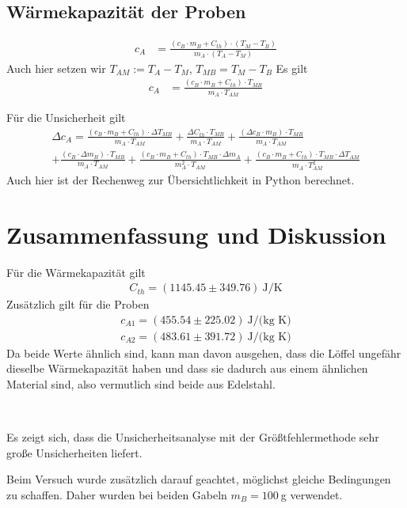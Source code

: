 \documentclass{article}
\begin{document}
\subsection{Wärmekapazität der Proben}

\begin{align}
c_A &=  \frac{(c_B\cdot m_B  + C_{th}) \cdot (T_M - T_B)}{m_A \cdot (T_A - T_M)}
\end{align}
Auch hier setzen wir $T_{AM} := T_A - T_M$, $T_{MB} = T_M-T_B$ 
Es gilt
\begin{align}
c_A &=  \frac{(c_B\cdot m_B  + C_{th}) \cdot T_{MB}}{m_A \cdot T_{AM}}
\end{align}

Für die Unsicherheit gilt
\begin{align*}
\Delta c_A =
\frac{(c_B\cdot m_B  + C_{th}) \cdot \Delta T_{MB}}{m_A \cdot T_{AM}} +
\frac{\Delta C_{th} \cdot T_{MB}}{m_A \cdot T_{AM}} +
\frac{(\Delta c_B\cdot m_B  ) \cdot T_{MB}}{m_A \cdot T_{AM}} \\
+\frac{(c_B\cdot \Delta m_B ) \cdot T_{MB}}{m_A \cdot T_{AM}}
+\frac{(c_B\cdot m_B  + C_{th}) \cdot T_{MB}\cdot \Delta m_A}{m_A^2 \cdot T_{AM}}
+\frac{(c_B\cdot m_B  + C_{th}) \cdot T_{MB}\cdot \Delta T_{AM}}{m_A \cdot T_{AM}^2}
\end{align*}
Auch hier ist der Rechenweg zur Übersichtlichkeit in Python berechnet.

\newpage
\section{Zusammenfassung und Diskussion}

Für die Wärmekapazität gilt
\begin{align}
C_{th} = (1145.45 \pm 349.76)~\text{J}/\text{K}
\end{align}
Zusätzlich gilt für die Proben
\begin{align}
c_{A1} = (455.54 \pm 225.02)~\text{J/(kg K)} \\
c_{A2} = (483.61 \pm 391.72)~\text{J/(kg K)} 
\end{align}
Da beide Werte ähnlich sind, kann man davon ausgehen, dass die Löffel ungefähr dieselbe Wärmekapazität haben und dass sie dadurch aus einem ähnlichen Material sind, also vermutlich sind beide aus Edelstahl.


~

Es zeigt sich, dass die Unsicherheitsanalyse mit der Größtfehlermethode sehr große Unsicherheiten liefert.

Beim Versuch wurde zusätzlich darauf geachtet, möglichst gleiche Bedingungen zu schaffen. Daher wurden bei beiden Gabeln $m_B = 100~$g verwendet.
\end{document}
